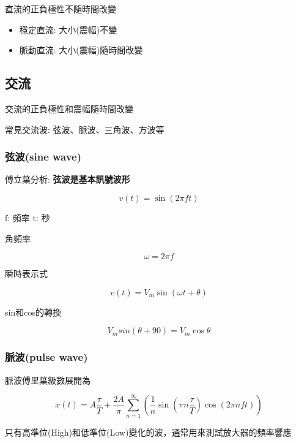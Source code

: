 \documentclass[
]{report}
\providecommand{\tightlist}{%
  \setlength{\itemsep}{0pt}\setlength{\parskip}{0pt}}
\begin{document}

直流的正負極性不隨時間改變

\begin{itemize}
\tightlist
\item
  穩定直流: 大小(震幅)不變
\item
  脈動直流: 大小(震幅)隨時間改變
\end{itemize}

\hypertarget{ux4ea4ux6d41}{%
\subsection{交流}\label{ux4ea4ux6d41}}

交流的正負極性和震幅隨時間改變

常見交流波: 弦波、脈波、三角波、方波等

\hypertarget{ux5f26ux6ce2sine-wave}{%
\subsubsection{弦波(sine wave)}\label{ux5f26ux6ce2sine-wave}}

傅立葉分析: \textbf{弦波是基本訊號波形}

\[
v(t) = \sin(2 \pi f t)
\]

f: 頻率 t: 秒

角頻率

\[
\omega = 2 \pi f
\]

瞬時表示式

\[
v(t) = V_m \sin (\omega t + \theta)
\]

sin和cos的轉換

\[
V_m sin(\theta + 90) = V_m \cos \theta
\]

\hypertarget{ux8108ux6ce2pulse-wave}{%
\subsubsection{脈波(pulse wave)}\label{ux8108ux6ce2pulse-wave}}

脈波傅里葉級數展開為

\[
x(t)=A{\frac {\tau }{T}}+{\frac {2A}{\pi }}\sum _{n=1}^{\infty }\left({\frac {1}{n}}\sin \left(\pi n{\frac {\tau }{T}}\right)\cos \left(2\pi nft\right)\right)
\]

只有高準位(High)和低準位(Low)變化的波，通常用來測試放大器的頻率響應
\end{document}
